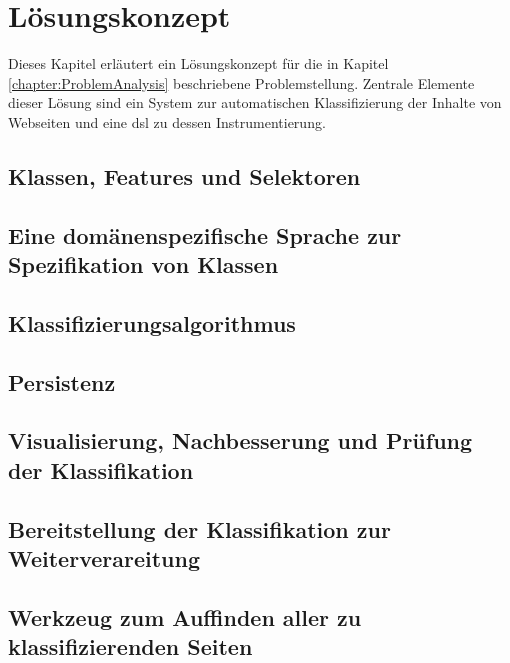 \chapter{Lösungskonzept}
    \label{chapter:SolutionConcept}
    Dieses Kapitel erläutert ein Lösungskonzept für die in Kapitel \ref{chapter:ProblemAnalysis} beschriebene Problemstellung.
    Zentrale Elemente dieser Lösung sind ein System zur automatischen Klassifizierung der Inhalte von Webseiten
    und eine \gls{dsl} zu dessen Instrumentierung.

    \section{Klassen, Features und Selektoren}
    \section{Eine domänenspezifische Sprache zur Spezifikation von Klassen}
    \section{Klassifizierungsalgorithmus}
        
    \section{Persistenz}
    \section{Visualisierung, Nachbesserung und Prüfung der Klassifikation}
    \section{Bereitstellung der Klassifikation zur Weiterverareitung}
    \section{Werkzeug zum Auffinden aller zu klassifizierenden Seiten}
